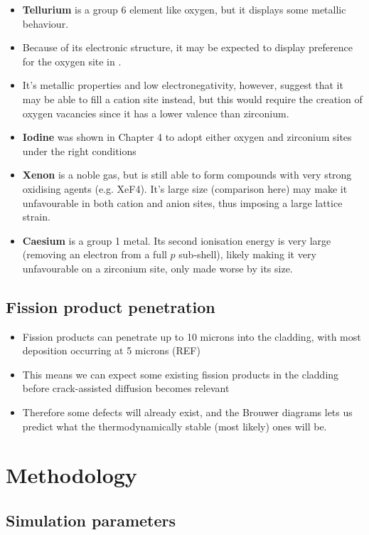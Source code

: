 \begin{itemize}

\item \textbf{Tellurium} is a group 6 element like oxygen, but it displays some metallic behaviour.
\item Because of its electronic structure, it may be expected to display preference for the oxygen site in \zirconia .
\item It's metallic properties and low electronegativity, however, suggest that it may be able to fill a cation site instead, but this would require the creation of oxygen vacancies since it has a lower valence than zirconium.
\item \textbf{Iodine} was shown in Chapter 4 to adopt either oxygen and zirconium sites under the right conditions
\item \textbf{Xenon} is a noble gas, but is still able to form compounds with very strong oxidising agents (e.g. XeF4). It's large size (comparison here) may make it unfavourable in both cation and anion sites, thus imposing a large lattice strain.
\item \textbf{Caesium} is a group 1 metal. Its second ionisation energy is very large (removing an electron from a full $p$ sub-shell), likely making it very unfavourable on a zirconium site, only made worse by its size.
\end{itemize}

\subsection{Fission product penetration}

\begin{itemize}
\item Fission products can penetrate up to 10 microns into the cladding, with most deposition occurring at 5 microns (REF)
\item This means we can expect some existing fission products in the cladding before crack-assisted diffusion becomes relevant
\item Therefore some defects will already exist, and the Brouwer diagrams lets us predict what the thermodynamically stable (most likely) ones will be.
\end{itemize}

\section{Methodology}
\subsection{Simulation parameters}

